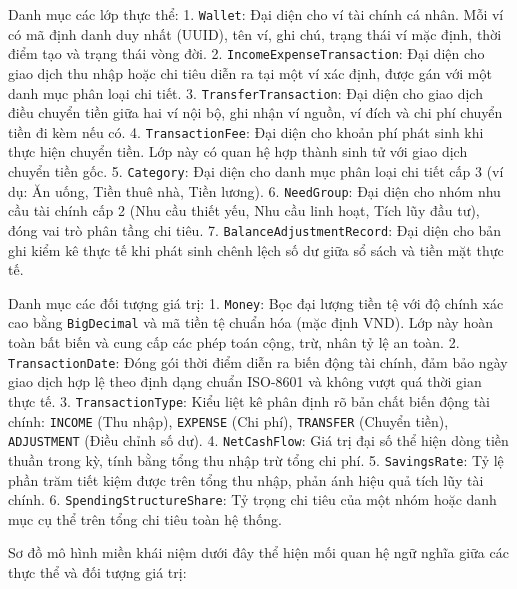 \documentclass[a4paper,12pt]{report}
\newcommand{\passthrough}[1]{#1}
\begin{document}
Danh mục các lớp thực thể: 1. \passthrough{\lstinline!Wallet!}: Đại diện
cho ví tài chính cá nhân. Mỗi ví có mã định danh duy nhất (UUID), tên
ví, ghi chú, trạng thái ví mặc định, thời điểm tạo và trạng thái vòng
đời. 2. \passthrough{\lstinline!IncomeExpenseTransaction!}: Đại diện cho
giao dịch thu nhập hoặc chi tiêu diễn ra tại một ví xác định, được gán
với một danh mục phân loại chi tiết. 3.
\passthrough{\lstinline!TransferTransaction!}: Đại diện cho giao dịch
điều chuyển tiền giữa hai ví nội bộ, ghi nhận ví nguồn, ví đích và chi
phí chuyển tiền đi kèm nếu có. 4.
\passthrough{\lstinline!TransactionFee!}: Đại diện cho khoản phí phát
sinh khi thực hiện chuyển tiền. Lớp này có quan hệ hợp thành sinh tử với
giao dịch chuyển tiền gốc. 5. \passthrough{\lstinline!Category!}: Đại
diện cho danh mục phân loại chi tiết cấp 3 (ví dụ: Ăn uống, Tiền thuê
nhà, Tiền lương). 6. \passthrough{\lstinline!NeedGroup!}: Đại diện cho
nhóm nhu cầu tài chính cấp 2 (Nhu cầu thiết yếu, Nhu cầu linh hoạt, Tích
lũy đầu tư), đóng vai trò phân tầng chi tiêu. 7.
\passthrough{\lstinline!BalanceAdjustmentRecord!}: Đại diện cho bản ghi
kiểm kê thực tế khi phát sinh chênh lệch số dư giữa sổ sách và tiền mặt
thực tế.

Danh mục các đối tượng giá trị: 1. \passthrough{\lstinline!Money!}: Bọc
đại lượng tiền tệ với độ chính xác cao bằng
\passthrough{\lstinline!BigDecimal!} và mã tiền tệ chuẩn hóa (mặc định
VND). Lớp này hoàn toàn bất biến và cung cấp các phép toán cộng, trừ,
nhân tỷ lệ an toàn. 2. \passthrough{\lstinline!TransactionDate!}: Đóng
gói thời điểm diễn ra biến động tài chính, đảm bảo ngày giao dịch hợp lệ
theo định dạng chuẩn ISO-8601 và không vượt quá thời gian thực tế. 3.
\passthrough{\lstinline!TransactionType!}: Kiểu liệt kê phân định rõ bản
chất biến động tài chính: \passthrough{\lstinline!INCOME!} (Thu nhập),
\passthrough{\lstinline!EXPENSE!} (Chi phí),
\passthrough{\lstinline!TRANSFER!} (Chuyển tiền),
\passthrough{\lstinline!ADJUSTMENT!} (Điều chỉnh số dư). 4.
\passthrough{\lstinline!NetCashFlow!}: Giá trị đại số thể hiện dòng tiền
thuần trong kỳ, tính bằng tổng thu nhập trừ tổng chi phí. 5.
\passthrough{\lstinline!SavingsRate!}: Tỷ lệ phần trăm tiết kiệm được
trên tổng thu nhập, phản ánh hiệu quả tích lũy tài chính. 6.
\passthrough{\lstinline!SpendingStructureShare!}: Tỷ trọng chi tiêu của
một nhóm hoặc danh mục cụ thể trên tổng chi tiêu toàn hệ thống.

Sơ đồ mô hình miền khái niệm dưới đây thể hiện mối quan hệ ngữ nghĩa
giữa các thực thể và đối tượng giá trị:
\end{document}
